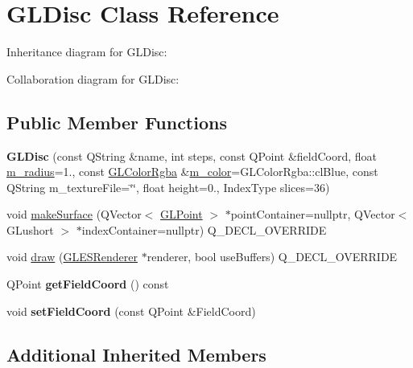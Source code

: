\hypertarget{class_g_l_disc}{}\section{G\+L\+Disc Class Reference}
\label{class_g_l_disc}


Inheritance diagram for G\+L\+Disc\+:


Collaboration diagram for G\+L\+Disc\+:
\subsection*{Public Member Functions}
\begin{DoxyCompactItemize}
\item 
\mbox{\label{class_g_l_disc_a0964e31d88f1b4915b536b9943e0e2f8}} 
{\bfseries G\+L\+Disc} (const Q\+String \&name, int steps, const Q\+Point \&field\+Coord, float \mbox{\hyperlink{class_g_l_body_a96006c2b453ffe0490bee1961e61e3b3}{m\+\_\+radius}}=1., const \mbox{\hyperlink{class_g_l_color_rgba}{G\+L\+Color\+Rgba}} \&\mbox{\hyperlink{class_g_l_body_a267b5c0fbe5752370197012975663dca}{m\+\_\+color}}=G\+L\+Color\+Rgba\+::cl\+Blue, const Q\+String m\+\_\+texture\+File=\char`\"{}\char`\"{}, float height=0., Index\+Type slices=36)
\item 
void \mbox{\hyperlink{class_g_l_disc_a5b74533be5d65c44f7f5493163b94eb4}{make\+Surface}} (Q\+Vector$<$ \mbox{\hyperlink{class_g_l_point}{G\+L\+Point}} $>$ $\ast$point\+Container=nullptr, Q\+Vector$<$ G\+Lushort $>$ $\ast$index\+Container=nullptr) Q\+\_\+\+D\+E\+C\+L\+\_\+\+O\+V\+E\+R\+R\+I\+DE
\item 
void \mbox{\hyperlink{class_g_l_disc_a7fca90525cba1fb6099d70730375cc6e}{draw}} (\mbox{\hyperlink{class_g_l_e_s_renderer}{G\+L\+E\+S\+Renderer}} $\ast$renderer, bool use\+Buffers) Q\+\_\+\+D\+E\+C\+L\+\_\+\+O\+V\+E\+R\+R\+I\+DE
\item 
\mbox{\label{class_g_l_disc_aa26416ba9591aa2d86b30b663e67a1a8}} 
Q\+Point {\bfseries get\+Field\+Coord} () const
\item 
\mbox{\label{class_g_l_disc_a5f73b9821e996ecdc909a743b79925dd}} 
void {\bfseries set\+Field\+Coord} (const Q\+Point \&Field\+Coord)
\end{DoxyCompactItemize}
\subsection*{Additional Inherited Members}


